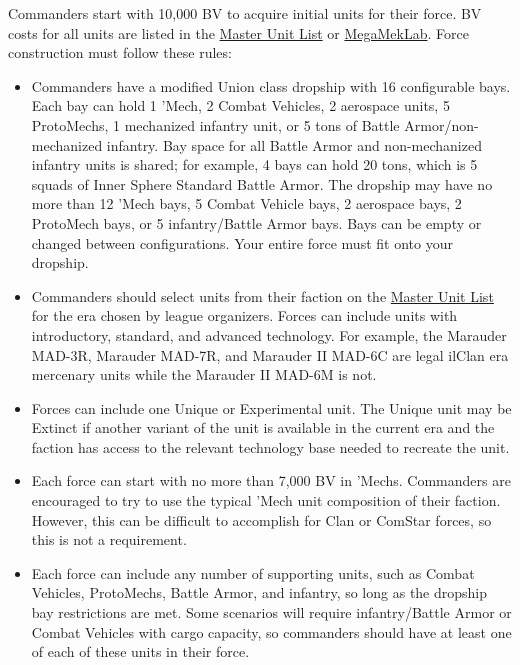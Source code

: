 Commanders start with 10,000 BV to acquire initial units for their force.
BV costs for all units are listed in the \href{http://www.masterunitlist.info}{Master Unit List} or \href{https://megamek.org}{MegaMekLab}.
Force construction must follow these rules:

\begin{itemize}

\item Commanders have a modified Union class dropship with 16 configurable bays.
Each bay can hold 1 'Mech, 2 Combat Vehicles, 2 aerospace units, 5 ProtoMechs, 1 mechanized infantry unit, or 5 tons of Battle Armor/non-mechanized infantry.
Bay space for all Battle Armor and non-mechanized infantry units is shared; for example, 4 bays can hold 20 tons, which is 5 squads of Inner Sphere Standard Battle Armor.
The dropship may have no more than 12 'Mech bays, 5 Combat Vehicle bays, 2 aerospace bays, 2 ProtoMech bays, or 5 infantry/Battle Armor bays.
Bays can be empty or changed between configurations.
Your entire force must fit onto your dropship.

\item Commanders should select units from their faction on the \href{http://www.masterunitlist.info/}{Master Unit List} for the era chosen by league organizers.
Forces can include units with introductory, standard, and advanced technology.
For example, the Marauder MAD-3R, Marauder MAD-7R, and Marauder II MAD-6C are legal ilClan era mercenary units while the Marauder II MAD-6M is not.

\item Forces can include one Unique or Experimental unit.
The Unique unit may be Extinct if another variant of the unit is available in the current era and the faction has access to the relevant technology base needed to recreate the unit.

\item Each force can start with no more than 7,000 BV in 'Mechs.
Commanders are encouraged to try to use the typical 'Mech unit composition of their faction.
However, this can be difficult to accomplish for Clan or ComStar forces, so this is not a requirement.

\item Each force can include any number of supporting units, such as Combat Vehicles, ProtoMechs, Battle Armor, and infantry, so long as the dropship bay restrictions are met.
Some scenarios will require infantry/Battle Armor or Combat Vehicles with cargo capacity, so commanders should have at least one of each of these units in their force.


\end{itemize}
